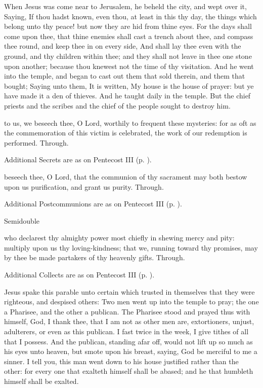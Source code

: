  When Jesus was come near to Jerusalem, he beheld the city, and wept over it, Saying, If thou hadst known, even thou, at least in this thy day, the things which belong unto thy peace! but now they are hid from thine eyes. For the days shall come upon thee, that thine enemies shall cast a trench about thee, and compass thee round, and keep thee in on every side, And shall lay thee even with the ground, and thy children within thee; and they shall not leave in thee one stone upon another; because thou knewest not the time of thy visitation. And he went into the temple, and began to cast out them that sold therein, and them that bought; Saying unto them, It is written, My house is the house of prayer: but ye have made it a den of thieves. And he taught daily in the temple. But the chief priests and the scribes and the chief of the people sought to destroy him.

\secret
{} to us, we beseech thee, O Lord, worthily to frequent these mysteries: for as oft as the commemoration of this victim is celebrated, the work of our redemption is performed. Through.
\begin{rubric}
    Additional Secrets are as on Pentecost III (p. \pageref{PentecostIII}).
\end{rubric}

\postcommunion
{} beseech thee, O Lord, that the communion of thy sacrament may both bestow upon us purification, and grant us purity. Through.
\begin{rubric}
    Additional Postcommunions are as on Pentecost III (p. \pageref{PentecostIII}).
\end{rubric}

\begin{inhead}
{Semidouble}
\end{inhead}

\collect
{} who declarest thy almighty power most chiefly in shewing mercy and pity: multiply upon us thy loving-kindness; that we, running toward thy promises, may by thee be made partakers of thy heavenly gifts. Through.
\begin{rubric}
    Additional Collects are as on Pentecost III (p. \pageref{PentecostIII}).
\end{rubric}

 Jesus spake this parable unto certain which trusted in themselves that they were righteous, and despised others: Two men went up into the temple to pray; the one a Pharisee, and the other a publican. The Pharisee stood and prayed thus with himself, God, I thank thee, that I am not as other men are, extortioners, unjust, adulterers, or even as this publican. I fast twice in the week, I give tithes of all that I possess. And the publican, standing afar off, would not lift up so much as his eyes unto heaven, but smote upon his breast, saying, God be merciful to me a sinner. I tell you, this man went down to his house justified rather than the other: for every one that exalteth himself shall be abased; and he that humbleth himself shall be exalted.

